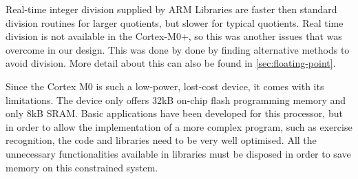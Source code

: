 Real-time integer division supplied by ARM Libraries are faster then standard division routines for larger quotients, but slower for typical  quotients. Real time division is not available in the Cortex-M0+, so this was another issues that was overcome in our design. This was done by done by finding alternative methods to avoid division. More detail about this can also be found in \ref{sec:floating-point}.

Since the Cortex M0 is such a low-power, lost-cost device, it comes with its limitations. The device only offers 32kB on-chip flash programming memory and only 8kB SRAM. Basic applications have been developed for this processor, but in order to allow the implementation of a more complex program, such as exercise recognition, the code and libraries need to be very well optimised. All the unnecessary functionalities available in libraries must be disposed in order to save memory on this constrained system.